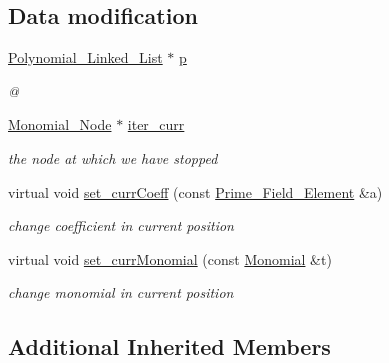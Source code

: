 \subsection*{Data modification}
\begin{DoxyCompactItemize}
\item 
\hyperlink{class_polynomial___linked___list}{Polynomial\+\_\+\+Linked\+\_\+\+List} $\ast$ \hyperlink{class_l_l_polynomial___iterator_a50151664e42e30b845a0a0d11577cfff}{p}
\begin{DoxyCompactList}\small\item\em @ \end{DoxyCompactList}\item 
\mbox{\label{class_l_l_polynomial___iterator_a750f8f8dd1e33b8a7107aa1b717eec72}} 
\hyperlink{class_monomial___node}{Monomial\+\_\+\+Node} $\ast$ \hyperlink{class_l_l_polynomial___iterator_a750f8f8dd1e33b8a7107aa1b717eec72}{iter\+\_\+curr}
\begin{DoxyCompactList}\small\item\em the node at which we have stopped \end{DoxyCompactList}\item 
\mbox{\label{class_l_l_polynomial___iterator_acfb16ffd698aca99fcee3e0a465ec563}} 
virtual void \hyperlink{class_l_l_polynomial___iterator_acfb16ffd698aca99fcee3e0a465ec563}{set\+\_\+curr\+Coeff} (const \hyperlink{class_prime___field___element}{Prime\+\_\+\+Field\+\_\+\+Element} \&a)
\begin{DoxyCompactList}\small\item\em change coefficient in current position \end{DoxyCompactList}\item 
\mbox{\label{class_l_l_polynomial___iterator_a8951f709b30302e3102e4d7d1590add5}} 
virtual void \hyperlink{class_l_l_polynomial___iterator_a8951f709b30302e3102e4d7d1590add5}{set\+\_\+curr\+Monomial} (const \hyperlink{class_monomial}{Monomial} \&t)
\begin{DoxyCompactList}\small\item\em change monomial in current position \end{DoxyCompactList}\end{DoxyCompactItemize}
\subsection*{Additional Inherited Members}


